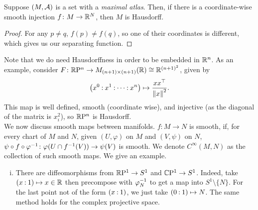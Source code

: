 \begin{corollary}
    Suppose $(M, \mathcal A)$ is a set with a \textit{maximal atlas}. Then, if there is a coordinate-wise smooth injection $f \colon M \to \mathbb R^N$, then $M$ is Hausdorff.
\end{corollary}
\begin{proof}
    For any $p \neq q$, $f(p) \neq f(q)$, so one of their coordinates is different, which gives us our separating function.
\end{proof}
Note that we do need Hausdorffness in order to be embedded in $\mathbb R^n$. As an example, consider $F \colon \mathbb{R}\mathrm{P}^n \to M_{(n+1)\times(n+1)}(\mathbb R) \cong \mathbb R^{(n+1)^2}$, given by
\[ \pcoor{x^0:x^1:\dots:x^n} \mapsto \frac{x x^\top}{\norm{x}^2}. \]
This map is well defined, smooth (coordinate wise), and injective (as the diagonal of the matrix is $x_i^2$), so $\mathbb{R}\mathrm{P}^n$ is Hausdorff.
\\[8pt]
We now discuss smooth maps between manifolds. $f \colon M \to N$ is smooth, if, for every chart of $M$ and $N$, given $(U, \varphi)$ on $M$ and $(V, \psi)$ on $N$, $\psi \circ f \circ \varphi^{-1} \colon \varphi(U \cap f^{-1}(V)) \to \psi(V)$ is smooth. We denote $C^\infty(M, N)$ as the collection of such smooth maps. We give an example.
\begin{enumerate}[(i)]
    \item There are diffeomorphisms from $\mathbb{R}\mathrm{P}^1 \to S^1$ and $\mathbb{C}\mathrm{P}^1 \to S^1$. Indeed, take $\pcoor{x:1} \mapsto x \in \RR$ then precompose with $\varphi_N^{-1}$ to get a map into $S^1 \setminus \{N\}$. For the last point not of the form $\pcoor{x:1}$, we just take $\pcoor{0:1} \mapsto N$. The same method holds for the complex projective space.
\end{enumerate}
